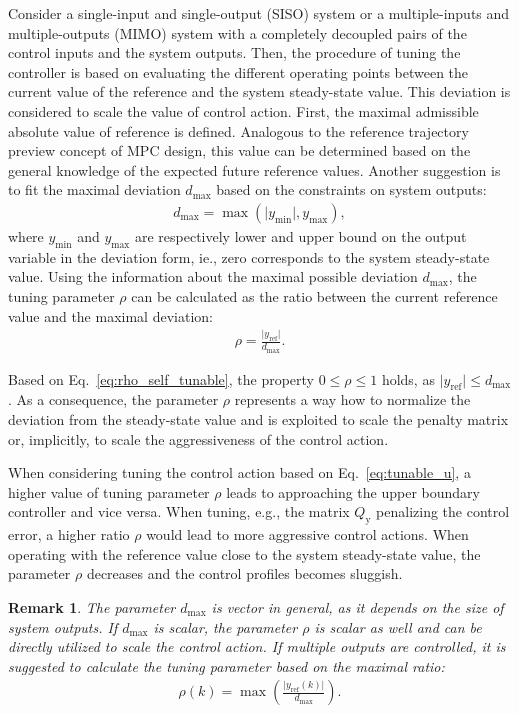 \documentclass[preprint,12pt]{elsarticle}
\newtheorem{remark}[theorem]{Remark}
\begin{document}
Consider a single-input and single-output (SISO) system or a multiple-inputs and multiple-outputs (MIMO) system with a completely decoupled pairs of the control inputs and the system outputs. 
Then, the procedure of tuning the controller is based on evaluating the different operating points between the current value of the reference and the system steady-state value. This deviation is considered to scale the value of control action. First, the maximal admissible absolute value of reference is defined. Analogous to the reference trajectory preview concept of MPC design, this value can be determined based on the general knowledge of the expected future reference values. Another suggestion is to fit the maximal deviation $d_{\max}$ based on the constraints on system outputs: 
\begin{eqnarray}
	\label{eq:d_max}
	d_{\max} = \max(\vert y_{\min} \vert, y_{\max}),
\end{eqnarray}
where $y_{\min}$ and $y_{\max}$ are respectively lower and upper bound on the output variable in the deviation form, ie., zero corresponds to the system steady-state value. Using the information about the maximal possible deviation $d_{\max}$, the tuning parameter $\rho$ can be calculated as the ratio between the current reference value and the maximal deviation:  
\begin{eqnarray}
	\label{eq:rho_self_tunable}
	\rho = \frac{\vert y_{\mathrm{ref}} \vert}{d_{\max}}.
\end{eqnarray}

Based on Eq.~\eqref{eq:rho_self_tunable}, the property $0 \le \rho \le 1$ holds, as $\vert y_{\mathrm{ref}} \vert \le d_{\max}$. As a consequence, the parameter $\rho$ represents a way how to normalize the deviation from the steady-state value and is exploited to scale the penalty matrix or, implicitly, to scale the aggressiveness of the control action. 

When considering tuning the control action based on Eq.~\eqref{eq:tunable_u}, a higher value of tuning parameter $\rho$ leads to approaching the upper boundary controller and vice versa. When tuning, e.g., the matrix $Q_\mathrm{y}$ penalizing the control error, a higher ratio $\rho$ would lead to more aggressive control actions. When operating with the reference value close to the system steady-state value, the parameter $\rho$ decreases and the control profiles becomes sluggish.

\begin{remark}
	The parameter $d_{\max}$ is vector in general, as it depends on the size of system outputs. If $d_{\max}$ is scalar, the parameter $\rho$ is scalar as well and can be directly utilized to scale the control action. If multiple outputs are controlled, it is suggested to calculate the tuning parameter based on the maximal ratio:
	\begin{eqnarray}
		\label{eq:rho_max}
		\rho(k) = \max \left( \frac{\vert y_{\mathrm{ref}}(k) \vert}{d_{\max}} \right).
	\end{eqnarray}	
\end{remark}
\end{document}
